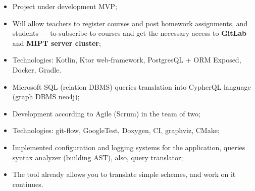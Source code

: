 \documentclass[10pt,a4paper,ragged2e,withhyper]{custom-altacv}
\begin{document}
\begin{paracol}{2}
\medskip




\begin{itemize}
	\item Project under development MVP;
	\item Will allow teachers to register courses and post homework assignments, and students --- to subscribe to courses and get the necessary access to \textbf{GitLab} and \textbf{MIPT server cluster};
	\item Technologies: Kotlin, Ktor web-framework, PostgresQL + ORM Exposed, Docker, Gradle.
\end{itemize}

\divider


\begin{itemize}
	\item Microsoft SQL (relation DBMS) queries translation into CypherQL language (graph DBMS neo4j);
	\item Development according to Agile (Scrum) in the team of two;
	\item Technologies: git-flow, GoogleTest, Doxygen, CI, graphviz, CMake;
	\item Implemented configuration and logging systems for the application, queries syntax analyzer (building AST), also, query translator;
	\item The tool already allows you to translate simple schemes, and work on it continues.
\end{itemize}

\iffalse
\divider

\cvproject{PDP-11 Emulator \cvtag{C}}{Coursework at MIPT}{April -- July 2021}{pdp11-emulator}{https://github.com/temikfart/pdp11-emulator/}

\begin{itemize}
	\item Coursework was done according to professor's specifications;
	\item Developed an extensive functionality: a lot of commands, processor state word, etc.
\end{itemize}
\fi



\end{paracol}
\end{document}
